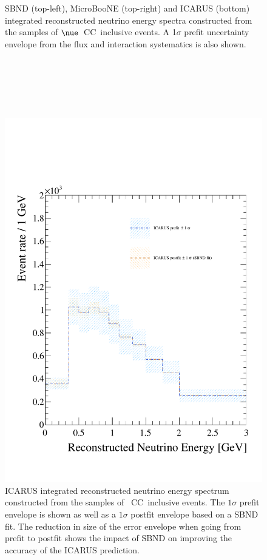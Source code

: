 \begin{figure}[h!]
  \captionsetup{width=0.49\textwidth}
  \parbox[b]{0.49\textwidth}%
  {
    \caption[SBN \nue CC inclusive reconstructed neutrino energy spectra with a 1$\sigma$ prefit envelopes.]{SBND (top-left), MicroBooNE (top-right) and ICARUS (bottom) integrated reconstructed neutrino energy spectra constructed from the samples of $\nue$~CC~inclusive events. A 1$\sigma$ prefit uncertainty envelope from the flux and interaction systematics is also shown. \\\\\\\\\\\\}
    \label{fig:nominal_nue_spectra_1sigma_enevelope} 
  }
\end{figure}

\begin{figure}[h!]
    \centering
    \includegraphics[width = \largefigwidth]{figures-chap6/spectra/envelopes/icarus_pre_post_fit_nue.pdf}
    \caption[ICARUS \nue CC inclusive neutrino energy spectra with a 1$\sigma$ prefit and postfit envelope.]{ICARUS integrated reconstructed neutrino energy spectrum constructed from the samples of \nue~CC~inclusive events. The $1\sigma$ prefit envelope is shown as well as a $1\sigma$ postfit envelope based on a SBND fit. The reduction in size of the error envelope when going from prefit to postfit shows the impact of SBND on improving the accuracy of the ICARUS prediction.}
    \label{fig:icarus_pre_post_fit}
\end{figure}

